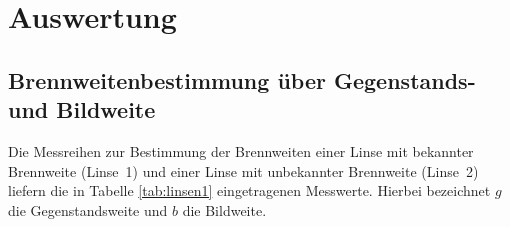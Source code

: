 
\section{Auswertung}
\subsection{Brennweitenbestimmung über Gegenstands- und Bildweite}

Die Messreihen zur Bestimmung der Brennweiten einer Linse mit bekannter
Brennweite (Linse~1) und einer Linse mit unbekannter Brennweite
(Linse~2) liefern die in Tabelle \ref{tab:linsen1} eingetragenen
Messwerte. Hierbei bezeichnet $g$ die Gegenstandsweite und $b$ die
Bildweite.

